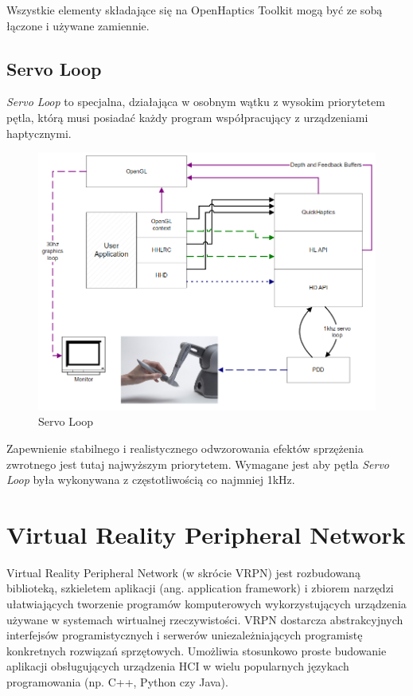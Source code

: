 \documentclass[licencjacka]{pracamgr}
\begin{document}
Wszystkie elementy składające się na OpenHaptics Toolkit mogą być ze sobą łączone i używane zamiennie. 

\section{Servo Loop}
\textit{Servo Loop} to specjalna, działająca w osobnym wątku z wysokim priorytetem pętla, którą musi posiadać każdy program współpracujący z urządzeniami haptycznymi.

\begin{figure}[H]
\centering
\includegraphics[scale=0.5,center]{servoloop}
\caption{Servo Loop}
\end{figure}

Zapewnienie stabilnego i realistycznego odwzorowania efektów sprzężenia zwrotnego jest tutaj najwyższym priorytetem. Wymagane jest aby pętla \textit{Servo Loop} była wykonywana z częstotliwością co najmniej 1kHz.

\chapter{Virtual Reality Peripheral Network}
Virtual Reality Peripheral Network (w skrócie VRPN) jest rozbudowaną biblioteką, szkieletem aplikacji (ang. application framework) i zbiorem narzędzi ułatwiających tworzenie programów komputerowych wykorzystujących urządzenia używane w systemach wirtualnej rzeczywistości. VRPN dostarcza abstrakcyjnych interfejsów programistycznych i serwerów uniezależniających programistę konkretnych rozwiązań sprzętowych. Umożliwia stosunkowo proste budowanie aplikacji obsługujących urządzenia HCI w wielu popularnych językach programowania (np. C++, Python czy Java).
\end{document}
